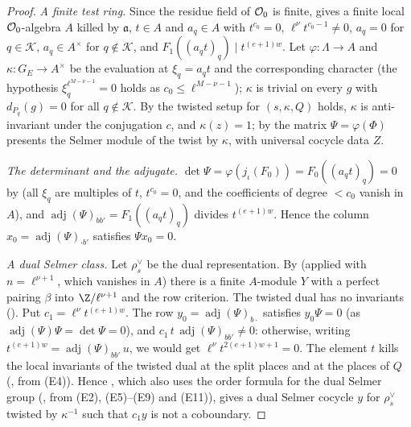 \begin{proof}
\emph{A finite test ring.} Since the residue field of $\mathcal O_0$ is finite,
 gives a finite local $\mathcal O_0$-algebra $A$ killed by
$\mathfrak a$, $t\in A$ and $a_q\in A$ with $t^{c_0}=0$, $\ell^\nu t^{c_0-1}\ne0$, $a_q=0$ for $q\in\mathcal K$, $a_q\in A^\times$ for
$q\notin\mathcal K$, and $F_1((a_qt)_q)\mid t^{(e+1)w}$. Let $\varphi\colon\Lambda\to A$ and $\kappa\colon G_E\to A^\times$ be the
evaluation at $\xi_q=a_qt$ and the corresponding character (the hypothesis $\xi_q^{\ell^{M-\nu-1}}=0$ holds as $c_0\le
\ell^{M-\nu-1}$); $\kappa$ is trivial on every $g$ with $d_{P_q}(g)=0$ for all $q\notin\mathcal K$. By
 the twisted setup for $(s,\kappa,Q)$ holds, $\kappa$ is anti-invariant
under the conjugation $c$, and $\kappa(z)=1$; by  the matrix $\Psi=\varphi(\Phi)$
presents the Selmer module of the twist by $\kappa$, with universal cocycle data $Z$.

\emph{The determinant and the adjugate.} $\det\Psi=\varphi(j_\iota(F_0))=F_0((a_qt)_q)=0$ by
 (all $\xi_q$ are multiples of $t$, $t^{c_0}=0$, and
the coefficients of degree $<c_0$ vanish in $A$), and $\operatorname{adj}(\Psi)_{bb'}=F_1((a_qt)_q)$ divides $t^{(e+1)w}$. Hence
the column $x_0=\operatorname{adj}(\Psi)_{\cdot b'}$ satisfies $\Psi x_0=0$.

\emph{A dual Selmer class.} Let $\rho^\vee_s$ be the dual representation. By
 (applied with $n=\ell^{\nu+1}$, which vanishes in $A$)
there is a finite $A$-module $Y$ with a perfect pairing $\beta$ into $\Z/\ell^{\nu+1}$ and the row criterion. The twisted dual has no
invariants (). Put $c_1=\ell^\nu t^{(e+1)w}$. The row
$y_0=\operatorname{adj}(\Psi)_{b\cdot}$ satisfies $y_0\Psi=0$ (as $\operatorname{adj}(\Psi)\Psi=\det\Psi=0$), and
$c_1\,t\,\operatorname{adj}(\Psi)_{bb'}\ne0$: otherwise, writing $t^{(e+1)w}=\operatorname{adj}(\Psi)_{bb'}\,u$, we would get
$\ell^\nu t^{2(e+1)w+1}=0$. The element $t$ kills the local invariants of the twisted dual at the split places and at the
places of $Q$ (, from (E4)). Hence
, which also uses the order formula for the dual Selmer group
(, from (E2), (E5)--(E9) and (E11)), gives a dual Selmer cocycle
$y$ for $\rho^\vee_s$ twisted by $\kappa^{-1}$ such that $c_1y$ is not a coboundary.


\end{proof}
